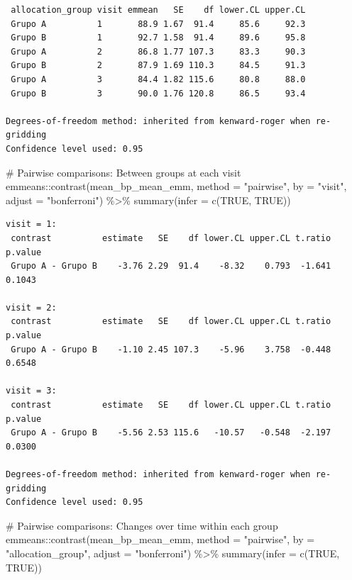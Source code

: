 \documentclass[
  letterpaper,
  DIV=11,
  numbers=noendperiod]{scrartcl}
\newenvironment{Shaded}{\begin{snugshade}}{\end{snugshade}}
\newcommand{\AttributeTok}[1]{\textcolor[rgb]{0.40,0.45,0.13}{#1}}
\newcommand{\CommentTok}[1]{\textcolor[rgb]{0.37,0.37,0.37}{#1}}
\newcommand{\ConstantTok}[1]{\textcolor[rgb]{0.56,0.35,0.01}{#1}}
\newcommand{\FunctionTok}[1]{\textcolor[rgb]{0.28,0.35,0.67}{#1}}
\newcommand{\NormalTok}[1]{\textcolor[rgb]{0.00,0.23,0.31}{#1}}
\newcommand{\SpecialCharTok}[1]{\textcolor[rgb]{0.37,0.37,0.37}{#1}}
\newcommand{\StringTok}[1]{\textcolor[rgb]{0.13,0.47,0.30}{#1}}
\begin{document}
\begin{verbatim}
 allocation_group visit emmean   SE    df lower.CL upper.CL
 Grupo A          1       88.9 1.67  91.4     85.6     92.3
 Grupo B          1       92.7 1.58  91.4     89.6     95.8
 Grupo A          2       86.8 1.77 107.3     83.3     90.3
 Grupo B          2       87.9 1.69 110.3     84.5     91.3
 Grupo A          3       84.4 1.82 115.6     80.8     88.0
 Grupo B          3       90.0 1.76 120.8     86.5     93.4

Degrees-of-freedom method: inherited from kenward-roger when re-gridding 
Confidence level used: 0.95 
\end{verbatim}

\begin{Shaded}
\begin{Highlighting}[]
\CommentTok{\# Pairwise comparisons: Between groups at each visit}
\NormalTok{emmeans}\SpecialCharTok{::}\FunctionTok{contrast}\NormalTok{(mean\_bp\_mean\_emm, }\AttributeTok{method =} \StringTok{"pairwise"}\NormalTok{, }\AttributeTok{by =} \StringTok{"visit"}\NormalTok{, }\AttributeTok{adjust =} \StringTok{"bonferroni"}\NormalTok{) }\SpecialCharTok{\%\textgreater{}\%} \FunctionTok{summary}\NormalTok{(}\AttributeTok{infer =} \FunctionTok{c}\NormalTok{(}\ConstantTok{TRUE}\NormalTok{, }\ConstantTok{TRUE}\NormalTok{))}
\end{Highlighting}
\end{Shaded}

\begin{verbatim}
visit = 1:
 contrast          estimate   SE    df lower.CL upper.CL t.ratio p.value
 Grupo A - Grupo B    -3.76 2.29  91.4    -8.32    0.793  -1.641  0.1043

visit = 2:
 contrast          estimate   SE    df lower.CL upper.CL t.ratio p.value
 Grupo A - Grupo B    -1.10 2.45 107.3    -5.96    3.758  -0.448  0.6548

visit = 3:
 contrast          estimate   SE    df lower.CL upper.CL t.ratio p.value
 Grupo A - Grupo B    -5.56 2.53 115.6   -10.57   -0.548  -2.197  0.0300

Degrees-of-freedom method: inherited from kenward-roger when re-gridding 
Confidence level used: 0.95 
\end{verbatim}

\begin{Shaded}
\begin{Highlighting}[]
\CommentTok{\# Pairwise comparisons: Changes over time within each group}
\NormalTok{emmeans}\SpecialCharTok{::}\FunctionTok{contrast}\NormalTok{(mean\_bp\_mean\_emm, }\AttributeTok{method =} \StringTok{"pairwise"}\NormalTok{, }\AttributeTok{by =} \StringTok{"allocation\_group"}\NormalTok{, }\AttributeTok{adjust =} \StringTok{"bonferroni"}\NormalTok{) }\SpecialCharTok{\%\textgreater{}\%} \FunctionTok{summary}\NormalTok{(}\AttributeTok{infer =} \FunctionTok{c}\NormalTok{(}\ConstantTok{TRUE}\NormalTok{, }\ConstantTok{TRUE}\NormalTok{))}
\end{Highlighting}
\end{Shaded}
\end{document}
